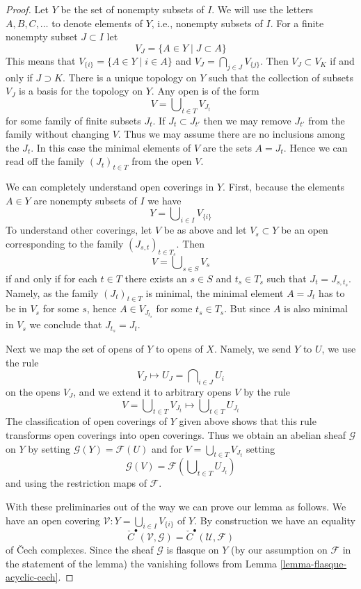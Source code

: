 \begin{proof}
Let $Y$ be the set of nonempty subsets of $I$. We will use the letters
$A, B, C, \ldots$ to denote elements of $Y$, i.e., nonempty subsets of $I$.
For a finite nonempty subset $J \subset I$ let
$$
V_J = \{A \in Y \mid J \subset A\}
$$
This means that $V_{\{i\}} = \{A \in Y \mid i \in A\}$ and
$V_J = \bigcap_{j \in J} V_{\{j\}}$.
Then $V_J \subset V_K$ if and only if $J \supset K$.
There is a unique topology on $Y$ such that the collection of
subsets $V_J$ is a basis for the topology on $Y$. Any open is of the form
$$
V = \bigcup\nolimits_{t \in T} V_{J_t}
$$
for some family of finite subsets $J_t$. If $J_t \subset J_{t'}$
then we may remove $J_{t'}$ from the family without changing $V$.
Thus we may assume there are no inclusions among the $J_t$.
In this case the minimal elements of $V$ are the sets $A = J_t$.
Hence we can read off the family $(J_t)_{t \in T}$ from the open $V$.

\medskip\noindent
We can completely understand open coverings in $Y$. First, because
the elements $A \in Y$ are nonempty subsets of $I$ we have
$$
Y = \bigcup\nolimits_{i \in I} V_{\{i\}}
$$
To understand other coverings, let $V$ be as above and let $V_s \subset Y$
be an open corresponding to the family $(J_{s, t})_{t \in T_s}$. Then
$$
V = \bigcup\nolimits_{s \in S} V_s
$$
if and only if for each $t \in T$ there exists an $s \in S$ and
$t_s \in T_s$ such that $J_t = J_{s, t_s}$. Namely, as the family
$(J_t)_{t \in T}$ is minimal, the minimal element $A = J_t$
has to be in $V_s$ for some $s$, hence $A \in V_{J_{t_s}}$ for some
$t_s \in T_s$. But since $A$ is also minimal in $V_s$ we conclude
that $J_{t_s} = J_t$.

\medskip\noindent
Next we map the set of opens of $Y$ to opens of $X$. Namely, we send
$Y$ to $U$, we use the rule
$$
V_J \mapsto U_J = \bigcap\nolimits_{i \in J} U_i
$$
on the opens $V_J$, and we extend it to arbitrary opens $V$ by the rule
$$
V = \bigcup\nolimits_{t \in T} V_{J_t}
\mapsto
\bigcup\nolimits_{t \in T} U_{J_t}
$$
The classification of open coverings of $Y$ given above shows that
this rule transforms open coverings into open coverings. Thus we obtain
an abelian sheaf $\mathcal{G}$ on $Y$ by setting
$\mathcal{G}(Y) = \mathcal{F}(U)$ and for
$V = \bigcup\nolimits_{t \in T} V_{J_t}$ setting
$$
\mathcal{G}(V) = \mathcal{F}\left(\bigcup\nolimits_{t \in T} U_{J_t}\right)
$$
and using the restriction maps of $\mathcal{F}$.

\medskip\noindent
With these preliminaries out of the way we can prove our lemma as follows.
We have an open covering
$\mathcal{V} : Y = \bigcup_{i \in I} V_{\{i\}}$ of $Y$.
By construction we have an equality
$$
\check{C}^\bullet(\mathcal{V}, \mathcal{G}) =
\check{C}^\bullet(\mathcal{U}, \mathcal{F})
$$
of {\v C}ech complexes. Since the sheaf $\mathcal{G}$ is flasque on $Y$
(by our assumption on $\mathcal{F}$ in the statement of the lemma)
the vanishing follows from
Lemma \ref{lemma-flasque-acyclic-cech}.
\end{proof}




